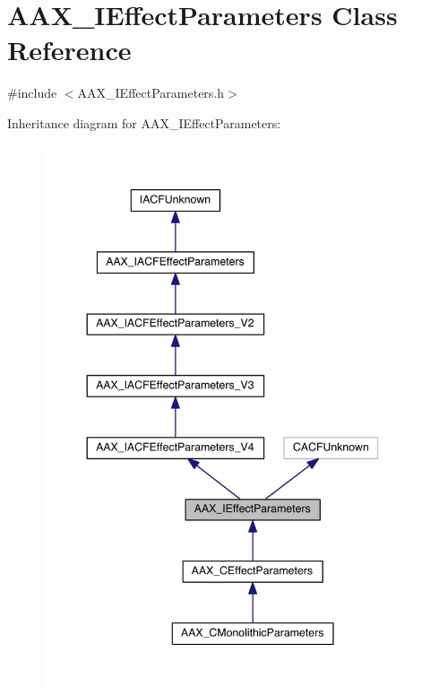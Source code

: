 \hypertarget{a00099}{}\section{A\+A\+X\+\_\+\+I\+Effect\+Parameters Class Reference}
\label{a00099}


{\ttfamily \#include $<$A\+A\+X\+\_\+\+I\+Effect\+Parameters.\+h$>$}



Inheritance diagram for A\+A\+X\+\_\+\+I\+Effect\+Parameters\+:
\nopagebreak
\begin{figure}[H]
\begin{center}
\leavevmode
\includegraphics[width=344pt]{a00630}
\end{center}
\end{figure}



